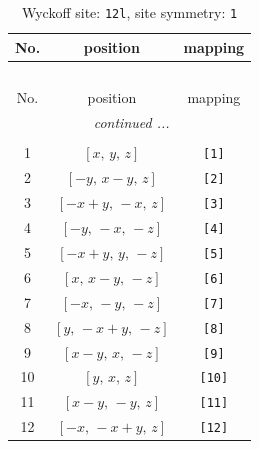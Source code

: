 \documentclass[fleqn,8pt]{jsarticle}
\begin{document}
\begin{longtable}{ccc}
\caption{Wyckoff site: {\tt 12l}, site symmetry: {\tt 1}}
 \\
 \hline \hline
No. & position & mapping \\ \hline \endfirsthead

\multicolumn{2}{l}{\tablename\ \thetable{}} \\
 \hline \hline
No. & position & mapping \\ \hline \endhead

 \hline \hline
\multicolumn{2}{r}{\footnotesize\it continued ...} \\ \endfoot

 \hline \hline
\multicolumn{2}{r}{} \\ \endlastfoot

1 & $\left[ x,\, y,\, z \right]$ & {\tt [1]} \\ \hline
2 & $\left[ - y,\, x - y,\, z \right]$ & {\tt [2]} \\ \hline
3 & $\left[ - x + y,\, - x,\, z \right]$ & {\tt [3]} \\ \hline
4 & $\left[ - y,\, - x,\, - z \right]$ & {\tt [4]} \\ \hline
5 & $\left[ - x + y,\, y,\, - z \right]$ & {\tt [5]} \\ \hline
6 & $\left[ x,\, x - y,\, - z \right]$ & {\tt [6]} \\ \hline
7 & $\left[ - x,\, - y,\, - z \right]$ & {\tt [7]} \\ \hline
8 & $\left[ y,\, - x + y,\, - z \right]$ & {\tt [8]} \\ \hline
9 & $\left[ x - y,\, x,\, - z \right]$ & {\tt [9]} \\ \hline
10 & $\left[ y,\, x,\, z \right]$ & {\tt [10]} \\ \hline
11 & $\left[ x - y,\, - y,\, z \right]$ & {\tt [11]} \\ \hline
12 & $\left[ - x,\, - x + y,\, z \right]$ & {\tt [12]} \\
\end{longtable}
\end{document}
